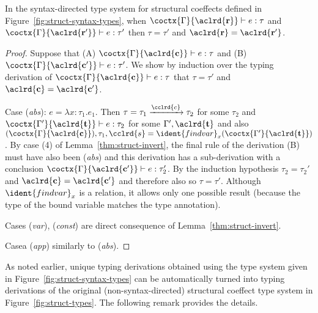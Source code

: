 \begin{theorem}
\label{thm:struct-unique}
In the syntax-directed type system for structural coeffects defined in Figure~\ref{fig:struct-syntax-types},
when $\coctx{\Gamma}{\aclrd{\textbf{r}}} \vdash e : \tau$ and
$\coctx{\Gamma}{\aclrd{\textbf{r}'}} \vdash e : \tau'$ then $\tau = \tau'$ and $\aclrd{\textbf{r}} = \aclrd{\textbf{r}'}$.
\end{theorem}
\begin{proof}
Suppose that (A) $\coctx{\Gamma}{\aclrd{\textbf{c}}} \vdash e : \tau$ and
(B) $\coctx{\Gamma}{\aclrd{\textbf{c}'}} \vdash e : \tau'$. We show by induction over the typing
derivation of $\coctx{\Gamma}{\aclrd{\textbf{c}}} \vdash e : \tau$ that $\tau = \tau'$ and $\aclrd{\textbf{c}}=\aclrd{\textbf{c}'}$.

\vspace{0.5em}\noindent\hangindent=0.6cm
Case (\emph{abs}): $e = \lambda x\!:\!\tau_1.e_1$. Then $\tau = \tau_1 \xrightarrow{\cclrd{c}} \tau_2$
  for some $\tau_2$ and $\coctx{\Gamma'}{\aclrd{\textbf{t}}} \vdash e : \tau_2$ for some $\Gamma', \aclrd{\textbf{t}}$
  and also $(\coctx{\Gamma}{\aclrd{\textbf{c}}}), \tau_1, \cclrd{s} = \ident{findvar}_x(\coctx{\Gamma'}{\aclrd{\textbf{t}}})$.
  By case (4) of Lemma~\ref{thm:struct-invert}, the final rule of the derivation (B) must
  have also been (\emph{abs}) and this derivation has a sub-derivation with a conclusion
  ${\coctx{\Gamma}{\aclrd{\textbf{c}'}} \vdash e : \tau_2'}$.
  By the induction hypothesis $\tau_2 = \tau_2'$ and $\aclrd{\textbf{c}}=\aclrd{\textbf{c}'}$ and therefore
  also so $\tau = \tau'$. Although $\ident{findvar}_x$ is a relation, it allows only one possible result
  (because the type of the bound variable matches the type annotation).

\vspace{0.5em}\noindent\hangindent=0.7cm
Cases (\emph{var}), (\emph{const}) are direct consequence of Lemma~\ref{thm:struct-invert}.

\vspace{0.5em}\noindent\hangindent=0.7cm
Casea (\emph{app}) similarly to (\emph{abs}).
\end{proof}

\noindent
As noted earlier, unique typing derivations obtained using the type system given in
Figure~\ref{fig:struct-syntax-types} can be automatically turned into typing derivations
of the original (non-syntax-directed) structural coeffect type system in Figure~\ref{fig:struct-types}.
The following remark provides the details.

